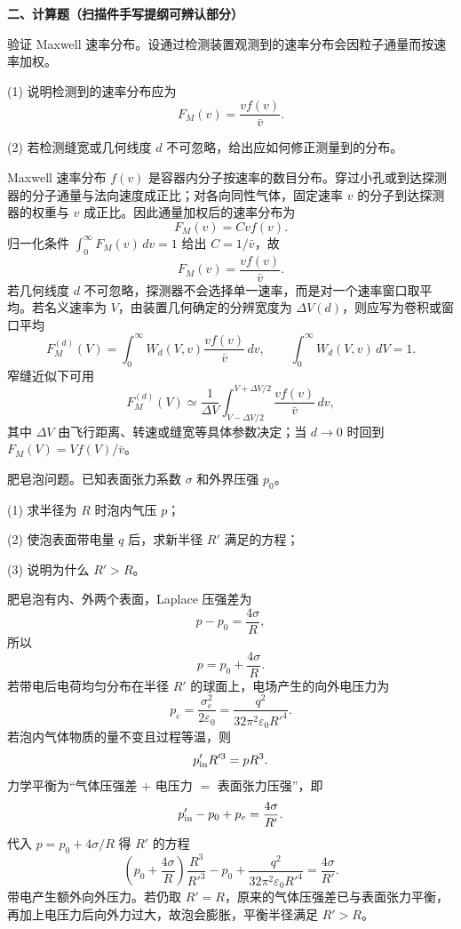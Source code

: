 \textbf{二、计算题（扫描件手写提纲可辨认部分）}

\begin{question}
验证 Maxwell 速率分布。设通过检测装置观测到的速率分布会因粒子通量而按速率加权。

(1) 说明检测到的速率分布应为
\[
F_M(v)=\frac{v f(v)}{\bar v}.
\]

(2) 若检测缝宽或几何线度 $d$ 不可忽略，给出应如何修正测量到的分布。
\begin{solution}
Maxwell 速率分布 $f(v)$ 是容器内分子按速率的数目分布。穿过小孔或到达探测器的分子通量与法向速度成正比；对各向同性气体，固定速率 $v$ 的分子到达探测器的权重与 $v$ 成正比。因此通量加权后的速率分布为
\[
F_M(v)=Cvf(v).
\]
归一化条件 $\int_0^\infty F_M(v)\,dv=1$ 给出 $C=1/\bar v$，故
\[
F_M(v)=\frac{v f(v)}{\bar v}.
\]
若几何线度 $d$ 不可忽略，探测器不会选择单一速率，而是对一个速率窗口取平均。若名义速率为 $V$，由装置几何确定的分辨宽度为 $\Delta V(d)$，则应写为卷积或窗口平均
\[
F_M^{(d)}(V)=\int_0^\infty W_d(V,v)\frac{v f(v)}{\bar v}\,dv,
\qquad
\int_0^\infty W_d(V,v)\,dV=1.
\]
窄缝近似下可用
\[
F_M^{(d)}(V)\simeq\frac1{\Delta V}\int_{V-\Delta V/2}^{V+\Delta V/2}\frac{v f(v)}{\bar v}\,dv,
\]
其中 $\Delta V$ 由飞行距离、转速或缝宽等具体参数决定；当 $d\to0$ 时回到 $F_M(V)=Vf(V)/\bar v$。
\end{solution}
\end{question}

\begin{question}
肥皂泡问题。已知表面张力系数 $\sigma$ 和外界压强 $p_0$。

(1) 求半径为 $R$ 时泡内气压 $p$；

(2) 使泡表面带电量 $q$ 后，求新半径 $R'$ 满足的方程；

(3) 说明为什么 $R'>R$。
\begin{solution}
肥皂泡有内、外两个表面，Laplace 压强差为
\[
p-p_0=\frac{4\sigma}{R},
\]
所以
\[
p=p_0+\frac{4\sigma}{R}.
\]
若带电后电荷均匀分布在半径 $R'$ 的球面上，电场产生的向外电压力为
\[
p_e=\frac{\sigma_e^2}{2\varepsilon_0}
=\frac{q^2}{32\pi^2\varepsilon_0 R'^4}.
\]
若泡内气体物质的量不变且过程等温，则
\[
p_{\rm in}'R'^3=pR^3.
\]
力学平衡为“气体压强差 $+$ 电压力 $=$ 表面张力压强”，即
\[
p_{\rm in}'-p_0+p_e=\frac{4\sigma}{R'}.
\]
代入 $p=p_0+4\sigma/R$ 得 $R'$ 的方程
\[
\left(p_0+\frac{4\sigma}{R}\right)\frac{R^3}{R'^3}-p_0
+\frac{q^2}{32\pi^2\varepsilon_0R'^4}
=\frac{4\sigma}{R'}.
\]
带电产生额外向外压力。若仍取 $R'=R$，原来的气体压强差已与表面张力平衡，再加上电压力后向外力过大，故泡会膨胀，平衡半径满足 $R'>R$。
\end{solution}
\end{question}

